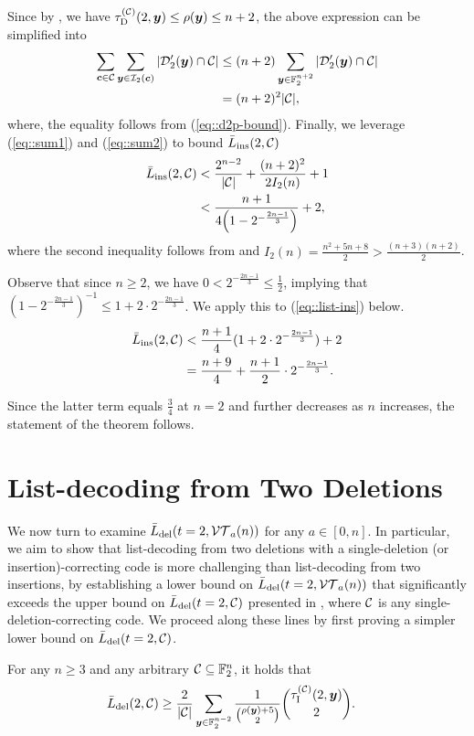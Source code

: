 \documentclass[conference, a4paper]{IEEEtran}
\begin{document}
\begin{IEEEproof}
Since by , we have $\tau_{\mathrm{D}}^{(\mathcal{C})}(2,{\boldsymbol y}) \leq \rho({\boldsymbol y}) \leq n+2$, the above expression can be simplified into
\begin{align}
    \sum_{{\boldsymbol c} \in \mathcal{C}}  \sum_{{\boldsymbol y} \in \mathcal{I}_{2}({\boldsymbol c})} |\mathcal{D}'_{2}({\boldsymbol y}) \cap \mathcal{C}| &\leq (n+2) \sum_{{\boldsymbol y} \in \mathbb{F}_2^{n+2}} |\mathcal{D}'_{2}({\boldsymbol y}) \cap \mathcal{C}| \nonumber \\
    &= (n+2)^2 |\mathcal{C}|, \label{eq::sum2}
\end{align}
where, the equality follows from (\ref{eq::d2p-bound}). Finally, we leverage (\ref{eq::sum1}) and (\ref{eq::sum2}) to bound $\bar{L}_\mathrm{ins}(2,\mathcal{C})$
\begin{align}
    \listins{2}{\cC} &< \frac{2^{n-2}}{|\cC|} + \frac{(n+2)^2}{2I_2(n)} + 1 \nonumber \\
    &< \frac{n+1}{4 \parenv*{1-2^{-\frac{2n-1}{3}}}} + 2, \label{eq::list-ins}
\end{align}
where the second inequality follows from  and $I_2(n) = \frac{n^2+5n+8}{2} > \frac{(n+3)(n+2)}{2}$.

Observe that since $n \geq 2$, we have $0 < 2^{-\frac{2n-1}{3}} \leq \frac{1}{2}$, implying that $(1- 2^{-\frac{2n-1}{3}})^{-1} \leq 1 + 2 \cdot 2^{-\frac{2n-1}{3}}$. We apply this to (\ref{eq::list-ins}) below.
\begin{align*}
    \bar{L}_\mathrm{ins}(2,\mathcal{C}) &<  \frac{n+1}{4}(1+2 \cdot 2^{-\frac{2n-1}{3}}) + 2 \\
    &= \frac{n+9}{4} + \frac{n+1}{2} \cdot 2^{-\frac{2n-1}{3}}.
\end{align*}

Since the latter term equals $\frac{3}{4}$ at $n=2$ and further decreases as $n$ increases, the statement of the theorem follows.
\end{IEEEproof}


\section{List-decoding from Two Deletions}

We now turn to examine $\bar{L}_\mathrm{del}(t = 2,\mathcal{VT}_{a}(n))$ for any $a \in [0,n]$. In particular, we aim to show that list-decoding from two deletions with a single-deletion (or insertion)-correcting code is more challenging than list-decoding from two insertions, by establishing a lower bound on $\bar{L}_\mathrm{del}(t = 2,\mathcal{VT}_{a}(n))$ that significantly exceeds the upper bound on $\bar{L}_\mathrm{del}(t = 2,\mathcal{C})$ presented in , where $\mathcal{C}$ is any single-deletion-correcting code. We proceed along these lines by first proving a simpler lower bound on $\bar{L}_\mathrm{del}(t = 2,\mathcal{C})$.
\begin{lemma}
    For any $n \geq 3$ and any arbitrary $\mathcal{C} \subseteq \mathbb{F}_2^n$, it holds that
    \begin{align*}
        \bar{L}_\mathrm{del}(2,\mathcal{C}) &\geq \frac{2}{|\mathcal{C}|}\sum_{{\boldsymbol y} \in \mathbb{F}_2^{n-2}} \frac{1}{\binom{\rho({\boldsymbol y}) + 5}{2}} \binom{\tau_{\mathrm{I}}^{(\mathcal{C})}(2,{\boldsymbol y}) }{2}.
    \end{align*}
    \label{lem::1-del-code-ld}
\end{lemma}
\end{document}
